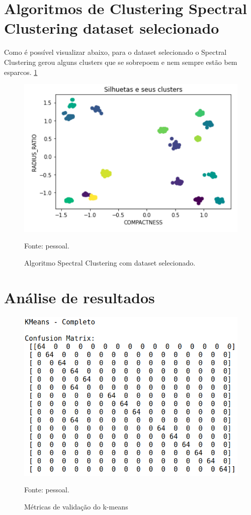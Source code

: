 \section{Algoritmos de Clustering Spectral Clustering dataset selecionado}

Como é possível visualizar abaixo, para o dataset selecionado o Spectral Clustering gerou alguns clusters que se sobrepoem e nem sempre estão bem esparcos. \ref{fig:dim128_spectral_selecionado}

\begin{figure}[h]
	\centering
	\includegraphics[width=0.7\linewidth]{images/dim128_spectral_selecionado}
	\caption{Algoritmo Spectral Clustering com dataset selecionado.}
	Fonte: pessoal.
	\label{fig:dim128_spectral_selecionado}
\end{figure}

\section{Análise de resultados}

\begin{figure}[h]
	\centering
	\includegraphics[width=0.7\linewidth]{images/dim128_result_kmeans_completo}
	\caption{Métricas de validação do k-means}
	Fonte: pessoal.
	\label{fig:dim128_result_kmeans_completo}
\end{figure}

